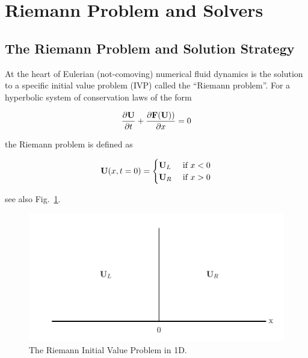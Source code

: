 \newpage
\section{Riemann Problem and Solvers} \label{chap:riemann}





\subsection{The Riemann Problem and Solution Strategy}



At the heart of Eulerian (not-comoving) numerical fluid dynamics is the
solution to a specific initial value problem (IVP) called the ``Riemann
problem''. For a hyperbolic system of conservation laws of the form

\begin{align}
	\frac{\partial \mathbf{U}}{\partial t} + \frac{\partial \mathbf{F}(\mathbf{U}))}{\partial x} = 0
\end{align}

the Riemann problem is defined as

\begin{align}
	\mathbf{U}(x, t=0) = 
		\begin{cases}
			\mathbf{U}_L & \text{ if } x < 0\\
			\mathbf{U}_R & \text{ if } x > 0\\
		\end{cases}
\end{align}

see also Fig.~\ref{fig:riemann-problem}.

\begin{figure}[H]
	\includegraphics{./figures/riemann_problem.pdf}%
	\caption{
		The Riemann Initial Value Problem in 1D.
		\label{fig:riemann-problem}
	}
\end{figure}






